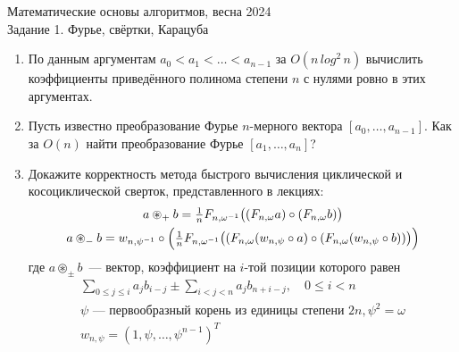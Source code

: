 \documentclass[11pt]{article}
\newenvironment{exercise}{\item}{}
\newcommand{\w}{\omega}
\newcommand{\bigpa}[1]{\bigl(#1\bigr)}
\newcommand{\Bigpa}[1]{\Bigl(#1\Bigr)}
\begin{document}
\begin{center}
	\Large Математические основы алгоритмов, весна 2024 \\
	\Large Задание 1. Фурье, свёртки, Карацуба
\end{center}


\begin{enumerate}

\begin{exercise}
По данным аргументам $a_0 < a_1 < \ldots < a_{n-1}$
за $O(n\, log^2\, n)$ вычислить коэффициенты приведённого полинома степени $n$ с нулями ровно в этих аргументах.
\end{exercise}

\begin{exercise}
Пусть известно преобразование Фурье \(n\)-мерного вектора \([a_0, \ldots, a_{n-1}]\).
Как за \(O(n)\) найти преобразование Фурье \([a_1, \ldots, a_n]\)?
\end{exercise}

\begin{exercise}
Докажите корректность метода быстрого вычисления циклической и косоциклической сверток,
представленного в лекциях:
%
\begin{gather*}
\textstyle a \circledast_+ b = \frac{1}{n} F_{n,\w^{-1}}\bigpa{(F_{n,\w}a)\circ (F_{n,\w}b)}\\
%
\textstyle a \circledast_- b = w_{n,\psi^{-1}} \circ 
\Bigpa{\frac{1}{n} F_{n,\w^{-1}}\bigpa{
  (F_{n,\w} (w_{n,\psi} \circ a)\circ (F_{n,\w} (w_{n,\psi} \circ b))}}
\end{gather*}
%
где \(a \circledast_{\pm} b\)~— вектор, коэффициент на \(i\)-той позиции которого равен
%
\begin{gather*}
  \sum_{0 \leq j \leq i} a_j b_{i-j} \pm 
  \sum_{i < j < n} a_j b_{n+i-j},\quad 0 \leq i < n\\
\text{$\psi$ --- первообразный корень из единицы степени $2n$},
\psi^2 = \w\\
w_{n,\psi} = (1,\psi,\ldots,\psi^{n-1})^T
\end{gather*}
\end{exercise}


\end{enumerate}
\end{document}

